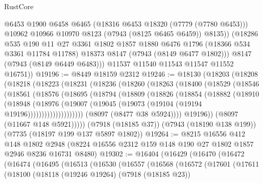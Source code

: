 \begin{lexlean}{RustCore}
\begin{coremodule}
              @6453
              @1900
              @6458
              @6465
              (@18316 @6453 @18320 (@7779 (@7780 @6453)))
              @10962
              @10966
              @10970
              @8123
              (@7943 (@8125 @6465 @6459))
              @8135))
          (@18286
            @535
            @190
            @11
            @27
            @3361
            @1802
            @1857
            @1880
            @6476
            @1796
            (@18366 @534 @3361 @11784 @11788)
            @18373
            @8147
            (@7943 (@8149 @6477 @1802)))
          @8147
          (@7943 (@8149 @6449 @6483)))
        @11537
        @11540
        @11543
        @11547
        @11552
        @16751))
@19196 := @8449 @18159 @2312
@19246 := @18130
    (@18203
      (@18208
        (@18218
          (@18223
            (@18231
              (@18236
                (@18260
                  (@18263
                    (@18400
                      (@18529
                        (@18546
                          (@18561
                            (@18576
                              (@18695
                                (@18794
                                  (@18809
                                    (@18826
                                      (@18854
                                        (@18882
                                          (@18910
                                            (@18948
                                              (@18976
                                                (@19007
                                                  (@19045
                                                    (@19073
                                                      (@19104 (@19194 @19196))))))))))))))))))))
                  (@8097 (@8477 @38 @5924))))
              @19196))
          (@8097 (@11667 @148 @5921)))))
    (@7918 (@18185 @37))
    (@7943 (@18190 @138 @199))
    (@7735 (@18197 @199 @137 @5897 @1802))
@19264 := @8215
    @16556
    @412
    @148
    @1802
    @2948
    (@8224 @16556 @2312 @159 @148 @190 @27 @1802 @1857 @2946 @8236 @16731 @8480)
@19302 := @16404
    (@16429
      (@16470
        (@16472
          (@16474
            (@16495
              (@16513
                (@16530
                  (@16557
                    (@16568
                      (@16572
                        (@17601
                          (@17611
                            (@18100
                              (@18118
                                (@19246 @19264)
                                (@7918 (@18185 @23))

\end{coremodule}
\end{lexlean}
